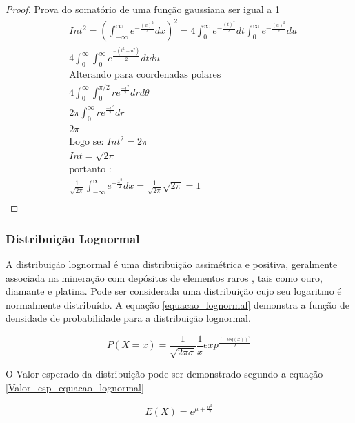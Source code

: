 \begin{proof} \label{prova_gauss}
	Prova do somatório de uma função gaussiana ser igual a 1
	\begin{align*}
	&Int^{2} = \left(\int_{-\infty}^{\infty} e^{-\frac{(x)^{2}}{2}}dx\right)^{2} = 4\int_{0}^{\infty} e^{-\frac{(t)^2}{2}}dt \int_{0}^{\infty} e^{-\frac{(u)^2}{2}}du\\
	&4\int_{0}^{\infty}\int_{0}^{\infty}e^{\frac{-(t^2+u^2)}{2}}dt du\\
	&\text{Alterando para coordenadas polares}\\
	&4\int_{0}^{\infty}\int_{0}^{\pi/2}re^{\frac{-r^{2}}{2}}drd\theta \\
	&2\pi\int_{0}^{\infty}re^{\frac{-r^{2}}{2}}dr \\
	&2\pi\\
	&\text{Logo se: }Int^{2} = 2\pi\\
	&Int = \sqrt{2\pi}\\
	&\text{portanto :} \\
	&\frac{1}{\sqrt{2\pi}} \int_{-\infty}^{\infty} e^{-\frac{x^{2}}{2}}dx = \frac{1}{\sqrt{2\pi}}\sqrt{2\pi} = 1\\
	\end{align*}
\end{proof}

\subsubsection{Distribuição Lognormal}

A distribuição lognormal é uma distribuição assimétrica e positiva, geralmente associada na mineração com depósitos de elementos raros , tais como ouro, diamante e platina. Pode ser considerada uma distribuição cujo seu logaritmo é normalmente distribuído. A equação \eqref{equacao_lognormal} demonstra a função de densidade de probabilidade para a distribuição lognormal.

\begin{equation}\label{equacao_lognormal}
P(X = x) = \frac{1}{\sqrt{2\pi\sigma}}\frac{1}{x}exp^{\frac{(-log(x))^2}{2}}
\end{equation}

O Valor esperado da distribuição pode ser demonstrado segundo a equação \eqref{Valor_esp_equacao_lognormal}

\begin{equation}\label{Valor_esp_equacao_lognormal}
E(X) = e^{\mu + \frac{\sigma^2}{2}}
\end{equation}

